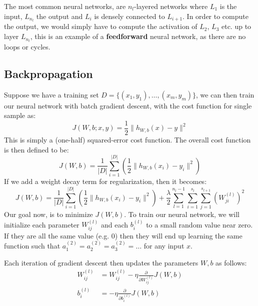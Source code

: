     The most common neural networks, are $n_l$-layered networks where $L_1$ is 
    the input, $L_{n_l}$ the output and $L_i$ is densely connected to 
    $L_{i+1}$. In order to compute the output, we would simply have to compute 
    the activation of $L_2$, $L_3$ etc. up to layer $L_{n_l}$, this is an 
    example of a \textbf{feedforward} neural network, as there are no loops or 
    cycles.
    
    \subsection{Backpropagation}
    Suppose we have a training set $D = \{(x_1,y_1),\dots,(x_m,y_m)\}$, we can 
    then train our neural network with batch gradient descent, with the cost 
    function for single sample as:
    \begin{equation*}
        J(W,b;x,y)=\frac{1}{2}\|h_{W,b}(x)-y\|^2
    \end{equation*} 
    This is simply a (one-half) squared-error cost function. The overall cost 
    function is then defined to be:
    \begin{equation*}
        J(W,b) = 
        \frac{1}{|D|}\sum_{i=1}^{|D|}\left(\frac{1}{2}\|h_{W,b}(x_i)-y_i\|^2\right)
    \end{equation*}
    If we add a weight decay term for regularization, then it becomes:
    \begin{equation*}
        J(W,b)=\frac{1}{|D|}\sum_{i=1}^{|D|}\left(\frac{1}{2}\|h_{W,b}(x_i)-y_i\|^2\right)
        + \frac{\lambda}{2} 
        \sum_{l=1}^{n_l-1}\sum_{i=1}^{s_l}\sum_{j=1}^{s_{l+1}}\left(W_{ji}^{(l)}\right)^2
    \end{equation*}
    Our goal now, is to minimize $J(W,b)$. To train our neural network, we will 
    initialize each parameter $W_{ij}^{(l)}$ and each $b_i^{(l)}$ to a small 
    random value near zero. If they are all the same value (e.g. $0$) then they 
    will end up learning the same function such that 
    $a_1^{(2)}=a_2^{(2)}=a_3^{(2)}=\dots$ for any input $x$.
    
    Each iteration of gradient descent then updates the parameters $W,b$ as 
    follows:
    \begin{align*}
        W_{ij}^{(l)}&=W_{ij}^{(l)}-\eta \frac{\partial}{\partial 
        W_{ij}^{(l)}}J(W,b)\\
        b_i^{(l)}&=-\eta \frac{\partial}{\partial b_i^{(l)}}J(W,b)
    \end{align*}
